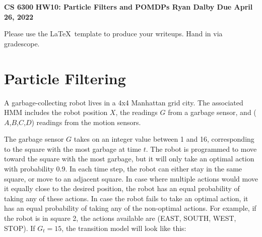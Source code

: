 \documentclass[12pt]{article}
\begin{document}
\begin{center}
{\bf CS 6300} \hfill {\large\bf HW10: Particle Filters and POMDPs \hfill {\bf Ryan Dalby} \hfill Due April 26, 2022}
\end{center}

\noindent
Please use the \LaTeX\ template to produce your writeups.  Hand in via
gradescope.

\section{Particle Filtering}
  
A garbage-collecting robot lives in a 4x4 Manhattan grid city.  The
associated HMM includes the robot position $X$, the readings $G$ from
a garbage sensor, and ($A$,$B$,$C$,$D$) readings from the motion
sensors.

\begin{figure}[h]
\end{figure}
  
The garbage sensor $G$ takes on an integer value between 1 and 16,
corresponding to the square with the most garbage at time $t$.  The
robot is programmed to move toward the square with the most garbage,
but it will only take an optimal action with probability 0.9.  In each
time step, the robot can either stay in the same square, or move to an
adjacent square. In case where multiple actions would move it equally
close to the desired position, the robot has an equal probability of
taking any of these actions. In case the robot fails to take an
optimal action, it has an equal probability of taking any of the
non-optimal actions. For example, if the robot is in square 2, the
actions available are (EAST, SOUTH, WEST, STOP). If $G_t = 15$, the
transition model will look like this:
\end{document}
